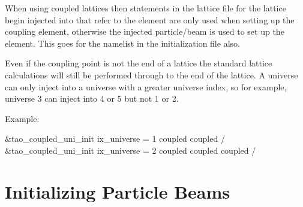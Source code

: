When using coupled lattices then statements in the lattice file for
the lattice begin injected into that refer to the 
element are only used when setting up the coupling element, otherwise
the injected particle/beam is used to set up the 
element. This goes for the  namelist in the
initialization file also.

Even if the coupling point is not the end of a lattice the standard lattice
calculations will still be performed through to the end of the
lattice.  A universe can only inject into a universe with a greater
universe index, so for example, universe 3 can inject into 4 or 5 but
not 1 or 2.

Example:
\begin{example}
  &tao_coupled_uni_init
    ix_universe = 1
    coupled%
    coupled%
  /
  &tao_coupled_uni_init
    ix_universe = 2
    coupled%
    coupled%
    coupled%
  /
\end{example}

\section{Initializing Particle Beams}
\label{s:beam_init}

